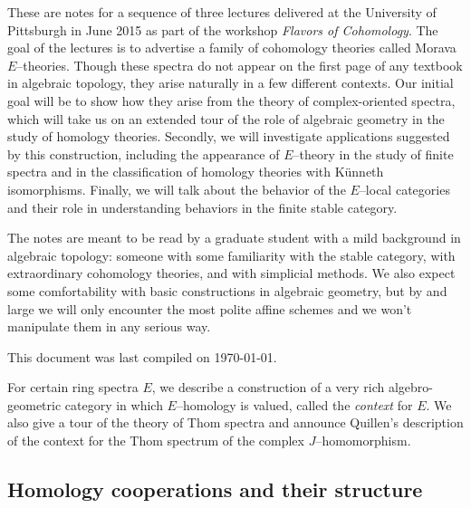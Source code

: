 
\newpage



These are notes for a sequence of three lectures delivered at the University of Pittsburgh in June 2015 as part of the workshop \textit{Flavors of Cohomology}.  The goal of the lectures is to advertise a family of cohomology theories called Morava $E$--theories.  Though these spectra do not appear on the first page of any textbook in algebraic topology, they arise naturally in a few different contexts.  Our initial goal will be to show how they arise from the theory of complex-oriented spectra, which will take us on an extended tour of the role of algebraic geometry in the study of homology theories.  Secondly, we will investigate applications suggested by this construction, including the appearance of $E$--theory in the study of finite spectra and in the classification of homology theories with K\"unneth isomorphisms.  Finally, we will talk about the behavior of the $E$--local categories and their role in understanding behaviors in the finite stable category.

The notes are meant to be read by a graduate student with a mild background in algebraic topology: someone with some familiarity with the stable category, with extraordinary cohomology theories, and with simplicial methods.  We also expect some comfortability with basic constructions in algebraic geometry, but by and large we will only encounter the most polite affine schemes and we won't manipulate them in any serious way.

This document was last compiled on \today.









\newpage
{}


For certain ring spectra $E$, we describe a construction of a very rich algebro-geometric category in which $E$--homology is valued, called the \textit{context} for $E$.  We also give a tour of the theory of Thom spectra and announce Quillen's description of the context for the Thom spectrum of the complex $J$--homomorphism.



\subsection*{Homology cooperations and their structure}

